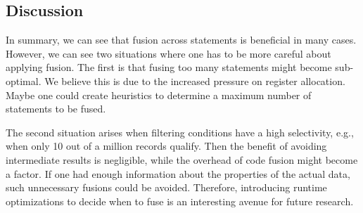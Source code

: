 

\subsection{Discussion}

In summary, we can see that fusion across statements is beneficial in many
cases. However, we can see two situations where one has to be more careful about
applying fusion. The first is that fusing too many statements might become
sub-optimal. We believe this is due to the increased pressure on register
allocation. Maybe one could create heuristics to determine a maximum number of
statements to be fused. 

The second situation arises when filtering conditions have a high selectivity,
e.g., when only 10 out of a million records qualify. Then the benefit of
avoiding intermediate results is negligible, while the overhead of code fusion
might become a factor. 
If one had enough information about the properties of the actual data, such
unnecessary fusions could be avoided. Therefore, introducing runtime optimizations
to decide when to fuse is an interesting avenue for future research.